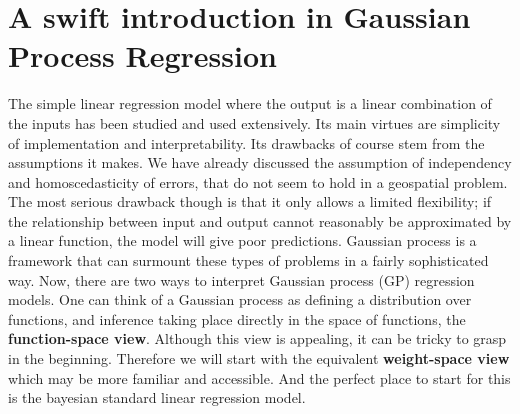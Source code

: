 \documentclass[12pt,a4paper,oneside]{book}
\theoremstyle{plain}
\theoremstyle{definition}
\begin{document}
{\section{A swift introduction in Gaussian Process Regression}
The simple linear regression model where the output is a linear combination of the inputs has been studied and used extensively.  Its main virtues are simplicity of implementation and interpretability. Its drawbacks of course stem from the assumptions it makes. We have already discussed the assumption of independency and homoscedasticity of errors, that do not seem to hold in a geospatial problem. The most serious drawback though is that it only allows a limited flexibility; if the relationship between input and output cannot reasonably be approximated by a linear function, the model will give poor predictions.  
\vspace{3mm}\newline
Gaussian process is a framework that can surmount these types of problems in a fairly sophisticated way. Now, there are two ways to interpret Gaussian process (GP) regression models. One can think of a Gaussian process as defining a distribution over functions, and inference taking place directly in the space of functions, the \textbf{function-space view}. Although this view is appealing, it can be tricky to grasp in the beginning. Therefore we will start with the equivalent \textbf{weight-space view} which may be more familiar and accessible. And the perfect place to start for this is the bayesian standard linear regression model.
}
\end{document}
